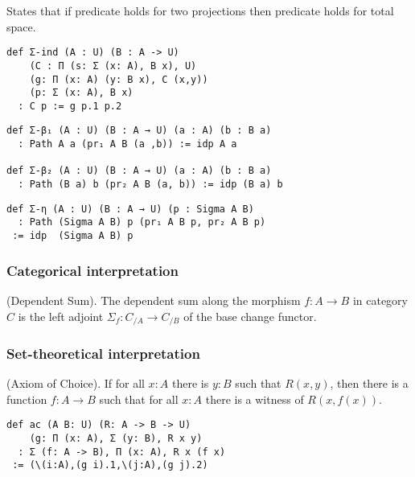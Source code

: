 \documentclass{article}
\begin{document}
\begin{definition} 
States that if predicate holds for two projections
then predicate holds for total space.
\begin{lstlisting}[mathescape=true]
def Σ-ind (A : U) (B : A -> U)
    (C : Π (s: Σ (x: A), B x), U)
    (g: Π (x: A) (y: B x), C (x,y))
    (p: Σ (x: A), B x)
  : C p := g p.1 p.2
\end{lstlisting}
\end{definition}

\begin{theorem} 
\begin{lstlisting}[mathescape=true]
def Σ-β₁ (A : U) (B : A → U) (a : A) (b : B a)
  : Path A a (pr₁ A B (a ,b)) := idp A a

def Σ-β₂ (A : U) (B : A → U) (a : A) (b : B a)
  : Path (B a) b (pr₂ A B (a, b)) := idp (B a) b
\end{lstlisting}
\end{theorem}

\begin{theorem} 
\begin{lstlisting}
def Σ-η (A : U) (B : A → U) (p : Sigma A B)
  : Path (Sigma A B) p (pr₁ A B p, pr₂ A B p)
 := idp  (Sigma A B) p
\end{lstlisting}
\end{theorem}

\subsubsection*{Categorical interpretation}

\begin{definition} (Dependent Sum).
The dependent sum along the morphism $f: A \rightarrow B$ in category $C$ is the left
adjoint $\Sigma_f : C_{/A} \rightarrow C_{/B}$ of the base change functor.
\end{definition}

\subsubsection*{Set-theoretical interpretation}

\begin{theorem} (Axiom of Choice).
If for all $x : A$ there is $y : B$ such that $R(x,y)$,
then there is a function $f : A \rightarrow B$
such that for all $x : A$ there is a witness of $R(x,f(x))$.
\begin{lstlisting}
def ac (A B: U) (R: A -> B -> U)
    (g: Π (x: A), Σ (y: B), R x y)
  : Σ (f: A -> B), Π (x: A), R x (f x)
 := (\(i:A),(g i).1,\(j:A),(g j).2)
\end{lstlisting}
\end{theorem}
\end{document}
